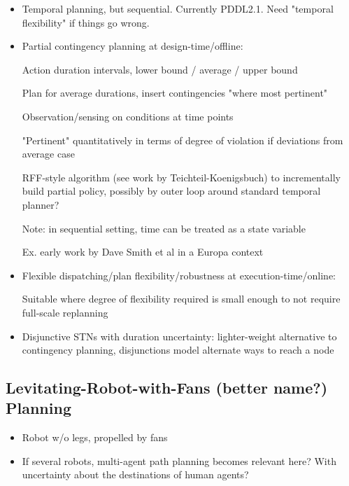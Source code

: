 \begin{itemize}

\item Temporal planning, but sequential. Currently PDDL2.1. Need
  "temporal flexibility" if things go wrong.

\item Partial contingency planning at design-time/offline:

    Action duration intervals, lower bound / average / upper bound
    
    Plan for average durations, insert contingencies "where most
    pertinent"
    
    Observation/sensing on conditions at time points
    
    "Pertinent" quantitatively in terms of degree of violation if
    deviations from average case
    
    RFF-style algorithm (see work by Teichteil-Koenigsbuch) to
    incrementally build partial policy, possibly by outer loop around
    standard temporal planner?
    
    Note: in sequential setting, time can be treated as a state
    variable
    
    Ex. early work by Dave Smith et al in a Europa context

\item Flexible dispatching/plan flexibility/robustness at
  execution-time/online:

    Suitable where degree of flexibility required is small enough to
    not require full-scale replanning
    
\item Disjunctive STNs with duration uncertainty: lighter-weight
  alternative to contingency planning, disjunctions model alternate
  ways to reach a node
    
\end{itemize}







\subsection{Levitating-Robot-with-Fans (better name?) Planning}

\begin{itemize}

\item Robot w/o legs, propelled by fans
   
\item If several robots, multi-agent path planning becomes relevant
  here? With uncertainty about the destinations of human agents?
  
\end{itemize}
